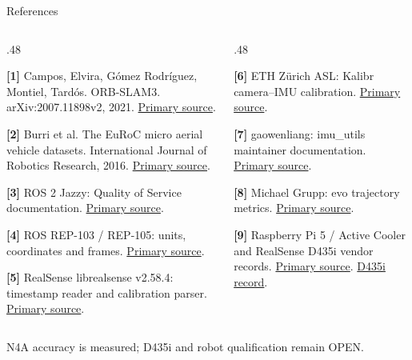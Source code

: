 \documentclass[aspectratio=169,12pt,t]{beamer}
\begin{document}
\begin{frame}{References}\hypertarget{referencepage}{}\footnotesize\begin{columns}[T,onlytextwidth]
\begin{column}{.48\textwidth}
\par\medskip\textbf{[1]} Campos, Elvira, Gómez Rodríguez, Montiel, Tardós. ORB-SLAM3. arXiv:2007.11898v2, 2021. \href{https://arxiv.org/abs/2007.11898}{Primary source}.
\par\medskip\textbf{[2]} Burri et al. The EuRoC micro aerial vehicle datasets. International Journal of Robotics Research, 2016. \href{https://projects.asl.ethz.ch/datasets/euroc-mav/}{Primary source}.
\par\medskip\textbf{[3]} ROS 2 Jazzy: Quality of Service documentation. \href{https://docs.ros.org/en/jazzy/Concepts/Intermediate/About-Quality-of-Service-Settings.html}{Primary source}.
\par\medskip\textbf{[4]} ROS REP-103 / REP-105: units, coordinates and frames. \href{https://www.ros.org/reps/rep-0105.html}{Primary source}.
\par\medskip\textbf{[5]} RealSense librealsense v2.58.4: timestamp reader and calibration parser. \href{https://github.com/realsenseai/librealsense/tree/v2.58.4}{Primary source}.
\end{column}
\begin{column}{.48\textwidth}
\par\medskip\textbf{[6]} ETH Zürich ASL: Kalibr camera–IMU calibration. \href{https://github.com/ethz-asl/kalibr/wiki/camera-imu-calibration}{Primary source}.
\par\medskip\textbf{[7]} gaowenliang: imu\_utils maintainer documentation. \href{https://github.com/gaowenliang/imu_utils}{Primary source}.
\par\medskip\textbf{[8]} Michael Grupp: evo trajectory metrics. \href{https://github.com/MichaelGrupp/evo/wiki/Metrics}{Primary source}.
\par\medskip\textbf{[9]} Raspberry Pi 5 / Active Cooler and RealSense D435i vendor records. \href{https://www.raspberrypi.com/products/raspberry-pi-5/}{Primary source}. \href{https://www.intel.com/content/www/us/en/products/sku/190004/intel-realsense-depth-camera-d435i/specifications.html}{D435i record}.
\end{column}
\end{columns}\vfill\normalsize N4A accuracy is measured; D435i and robot qualification remain OPEN.\end{frame}
\end{document}
